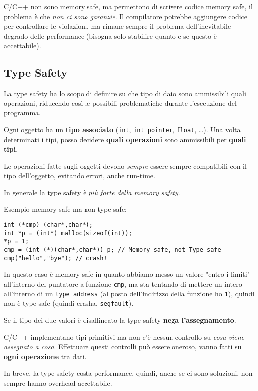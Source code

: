 C/C++ non sono memory safe, ma permettono di scrivere codice memory safe, il problema è che \textit{non ci sono garanzie}. Il compilatore potrebbe aggiungere codice per controllare le violazioni, ma rimane sempre il problema dell'inevitabile degrado delle performance (bisogna solo stabilire quanto e se questo è accettabile).


\subsection{Type Safety}

La type safety ha lo scopo di definire su che tipo di dato sono ammissibili quali operazioni, riducendo così le possibili problematiche durante l'esecuzione del programma.

Ogni oggetto ha un \textbf{tipo associato} (\texttt{int}, \texttt{int pointer}, \texttt{float}, \dots). Una volta determinati i tipi, posso decidere \textbf{quali operazioni} sono ammissibili per \textbf{quali tipi}. 

Le operazioni fatte sugli oggetti devono \textit{sempre} essere sempre compatibili con il tipo dell'oggetto, evitando errori, anche run-time.

In generale la type safety è \textit{più forte della memory safety}. 

Esempio memory safe ma non type safe:
\begin{verbatim}
int (*cmp) (char*,char*);
int *p = (int*) malloc(sizeof(int));
*p = 1;
cmp = (int (*)(char*,char*)) p; // Memory safe, not Type safe
cmp("hello","bye"); // crash!
\end{verbatim}

In questo caso è memory safe in quanto abbiamo messo un valore "entro i limiti" all'interno del puntatore a funzione \texttt{cmp}, ma sta tentando di mettere un intero all'interno di un \texttt{type address} (al posto dell'indirizzo della funzione ho \texttt{1}), quindi non è type safe (quindi crasha, \texttt{segfault}). 

Se il tipo dei due valori è disallineato la type safety \textbf{nega l'assegnamento}.

C/C++ implementano tipi primitivi ma non c'è nessun controllo su \textit{cosa viene assegnato a cosa}. Effettuare questi controlli può essere oneroso, vanno fatti su \textbf{ogni operazione} tra dati. 

In breve, la type safety costa performance, quindi, anche se ci sono soluzioni, non sempre hanno overhead accettabile. 

